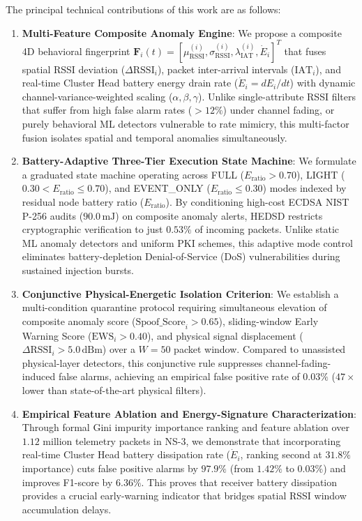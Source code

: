 \documentclass[conference]{IEEEtran}
\begin{document}
The principal technical contributions of this work are as follows:
\begin{enumerate}
    \item \textbf{Multi-Feature Composite Anomaly Engine}: We propose a composite 4D behavioral fingerprint $\mathbf{F}_i(t) = [\mu_{\text{RSSI}}^{(i)}, \sigma_{\text{RSSI}}^{(i)}, \lambda_{\text{IAT}}^{(i)}, \dot{E}_i]^T$ that fuses spatial RSSI deviation ($\Delta\text{RSSI}_i$), packet inter-arrival intervals ($\text{IAT}_i$), and real-time Cluster Head battery energy drain rate ($\dot{E}_i = dE_i/dt$) with dynamic channel-variance-weighted scaling ($\alpha, \beta, \gamma$). Unlike single-attribute RSSI filters that suffer from high false alarm rates ($>12\%$) under channel fading, or purely behavioral ML detectors vulnerable to rate mimicry, this multi-factor fusion isolates spatial and temporal anomalies simultaneously.

    \item \textbf{Battery-Adaptive Three-Tier Execution State Machine}: We formulate a graduated state machine operating across FULL ($E_{\text{ratio}} > 0.70$), LIGHT ($0.30 < E_{\text{ratio}} \le 0.70$), and EVENT\_ONLY ($E_{\text{ratio}} \le 0.30$) modes indexed by residual node battery ratio ($E_{\text{ratio}}$). By conditioning high-cost ECDSA NIST P-256 audits ($90.0\,\text{mJ}$) on composite anomaly alerts, HEDSD restricts cryptographic verification to just $0.53\%$ of incoming packets. Unlike static ML anomaly detectors and uniform PKI schemes, this adaptive mode control eliminates battery-depletion Denial-of-Service (DoS) vulnerabilities during sustained injection bursts.

    \item \textbf{Conjunctive Physical-Energetic Isolation Criterion}: We establish a multi-condition quarantine protocol requiring simultaneous elevation of composite anomaly score ($\text{Spoof\_Score}_i > 0.65$), sliding-window Early Warning Score ($\text{EWS}_i > 0.40$), and physical signal displacement ($\Delta\text{RSSI}_i > 5.0\,\text{dBm}$) over a $W=50$ packet window. Compared to unassisted physical-layer detectors, this conjunctive rule suppresses channel-fading-induced false alarms, achieving an empirical false positive rate of $0.03\%$ ($47\times$ lower than state-of-the-art physical filters).

    \item \textbf{Empirical Feature Ablation and Energy-Signature Characterization}: Through formal Gini impurity importance ranking and feature ablation over $1.12$ million telemetry packets in NS-3, we demonstrate that incorporating real-time Cluster Head battery dissipation rate ($\dot{E}_i$, ranking second at $31.8\%$ importance) cuts false positive alarms by $97.9\%$ (from $1.42\%$ to $0.03\%$) and improves F1-score by $6.36\%$. This proves that receiver battery dissipation provides a crucial early-warning indicator that bridges spatial RSSI window accumulation delays.


\end{enumerate}
\end{document}
